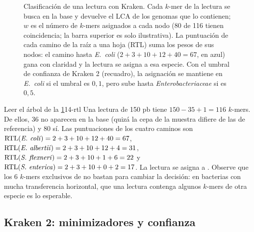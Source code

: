 \begin{figure}[t]
\caption[Clasificación por LCA en Kraken]{Clasificación de una lectura con Kraken. Cada $k$-mer de la lectura se busca en la base y devuelve el LCA de los genomas que lo contienen; $w$ es el número de $k$-mers asignados a cada nodo (80 de 116 tienen coincidencia; la barra superior es solo ilustrativa). La puntuación de cada camino de la raíz a una hoja (RTL) suma los pesos de sus nodos: el camino hasta \emph{E.~coli} ($2+3+10+12+40=67$, en azul) gana con claridad y la lectura se asigna a esa especie. Con el umbral de confianza de Kraken 2 (recuadro), la asignación se mantiene en \emph{E.~coli} si el umbral es $0{,}1$, pero sube hasta \emph{Enterobacteriaceae} si es $0{,}5$.}
\label{fig:14-lca}
\end{figure}

\begin{ejemplo}{Leer el árbol de la \cref{fig:14-lca}}{14-rtl}
Una lectura de 150 pb tiene $150-35+1 = 116$ $k$-mers. De ellos, 36 no aparecen en la base (quizá la cepa de la muestra difiere de las de referencia) y 80 sí. Las puntuaciones de los cuatro caminos son $\mathrm{RTL}(\text{\emph{E.~coli}}) = 2+3+10+12+40 = 67$, $\mathrm{RTL}(\text{\emph{E.~albertii}}) = 2+3+10+12+4 = 31$, $\mathrm{RTL}(\text{\emph{S.~flexneri}}) = 2+3+10+1+6 = 22$ y $\mathrm{RTL}(\text{\emph{S.~enterica}}) = 2+3+10+0+2 = 17$. La lectura se asigna a . Observe que los 6 $k$-mers exclusivos de  no bastan para cambiar la decisión: en bacterias con mucha transferencia horizontal, que una lectura contenga algunos $k$-mers de otra especie es lo esperable.
\end{ejemplo}

\subsection{Kraken 2: minimizadores y confianza}

